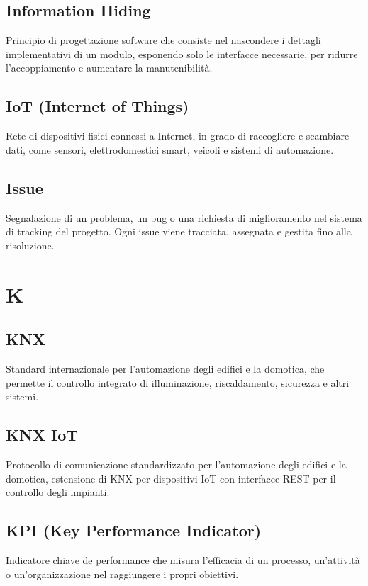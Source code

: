 \documentclass[a4paper,11pt]{article}
\begin{document}
\subsection{Information Hiding}
Principio di progettazione software che consiste nel nascondere i dettagli implementativi di un modulo, esponendo solo le interfacce necessarie, per ridurre l'accoppiamento e aumentare la manutenibilità.

\subsection{IoT (Internet of Things)}
Rete di dispositivi fisici connessi a Internet, in grado di raccogliere e scambiare dati, come sensori, elettrodomestici smart, veicoli e sistemi di automazione.

\subsection{Issue}
Segnalazione di un problema, un bug o una richiesta di miglioramento nel sistema di tracking del progetto. Ogni issue viene tracciata, assegnata e gestita fino alla risoluzione.

\newpage
\section{K}

\subsection{KNX}
Standard internazionale per l'automazione degli edifici e la domotica, che permette il controllo integrato di illuminazione, riscaldamento, sicurezza e altri sistemi.

\subsection{KNX IoT}
Protocollo di comunicazione standardizzato per l'automazione degli edifici e la domotica, estensione di KNX per dispositivi IoT con interfacce REST per il controllo degli impianti.

\subsection{KPI (Key Performance Indicator)}
Indicatore chiave de performance che misura l'efficacia di un processo, un'attività o un'organizzazione nel raggiungere i propri obiettivi.
\end{document}
